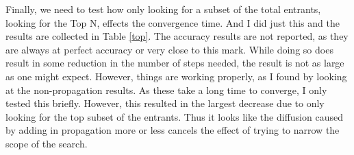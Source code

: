 \documentclass[11pt]{article}
\begin{document}
\noindent Finally, we need to test how only looking for a subset of the total entrants, looking for the Top N, effects the convergence time. And I did just this and the results are collected in Table \ref{top}. The accuracy results are not reported, as they are always at perfect accuracy or very close to this mark. While doing so does result in some reduction in the number of steps needed, the result is not as large as one might expect. However, things are working properly, as I found by looking at the non-propagation results. As these take a long time to converge, I only tested this briefly. However, this resulted in the largest decrease due to only looking for the top subset of the entrants. Thus it looks like the diffusion caused by adding in propagation more or less cancels the effect of trying to narrow the scope of the search. 
\end{document}
